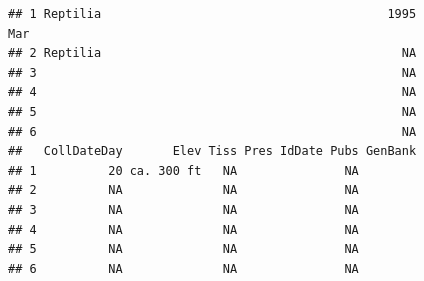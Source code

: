\documentclass[
]{article}
\begin{document}
\begin{verbatim}
## 1 Reptilia                                        1995           Mar
## 2 Reptilia                                          NA              
## 3                                                   NA              
## 4                                                   NA              
## 5                                                   NA              
## 6                                                   NA              
##   CollDateDay       Elev Tiss Pres IdDate Pubs GenBank
## 1          20 ca. 300 ft   NA               NA        
## 2          NA              NA               NA        
## 3          NA              NA               NA        
## 4          NA              NA               NA        
## 5          NA              NA               NA        
## 6          NA              NA               NA
\end{verbatim}
\end{document}

